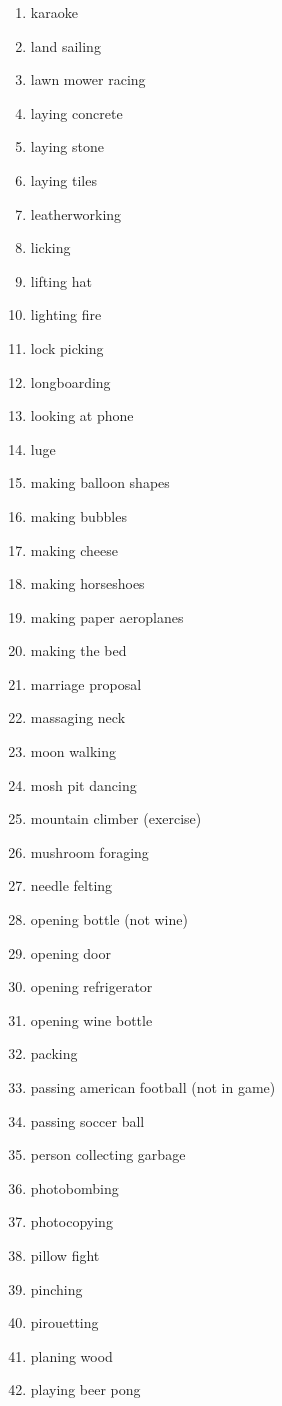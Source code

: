 \documentclass[10pt,twocolumn,letterpaper]{article}
\begin{document}
\begin{enumerate}
\item karaoke
\item land sailing
\item lawn mower racing
\item laying concrete
\item laying stone
\item laying tiles
\item leatherworking
\item licking
\item lifting hat
\item lighting fire
\item lock picking
\item longboarding
\item looking at phone
\item luge
\item making balloon shapes
\item making bubbles
\item making cheese
\item making horseshoes
\item making paper aeroplanes
\item making the bed
\item marriage proposal
\item massaging neck
\item moon walking
\item mosh pit dancing
\item mountain climber (exercise)
\item mushroom foraging
\item needle felting
\item opening bottle (not wine)
\item opening door
\item opening refrigerator
\item opening wine bottle
\item packing
\item passing american football (not in game)
\item passing soccer ball
\item person collecting garbage
\item photobombing
\item photocopying
\item pillow fight
\item pinching
\item pirouetting
\item planing wood
\item playing beer pong

\end{enumerate}
\end{document}
